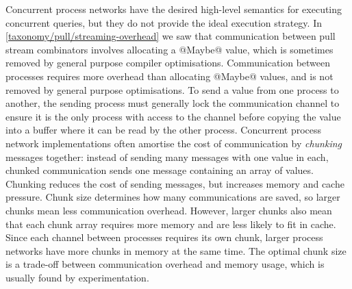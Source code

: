 Concurrent process networks have the desired high-level semantics for executing concurrent queries, but they do not provide the ideal execution strategy.
In \autoref{taxonomy/pull/streaming-overhead} we saw that communication between pull stream combinators involves allocating a @Maybe@ value, which is sometimes removed by general purpose compiler optimisations.
Communication between processes requires more overhead than allocating @Maybe@ values, and is not removed by general purpose optimisations.
To send a value from one process to another, the sending process must generally lock the communication channel to ensure it is the only process with access to the channel before copying the value into a buffer where it can be read by the other process.
Concurrent process network implementations often amortise the cost of communication by \emph{chunking} messages together: instead of sending many messages with one value in each, chunked communication sends one message containing an array of values.
Chunking reduces the cost of sending messages, but increases memory and cache pressure.
Chunk size determines how many communications are saved, so larger chunks mean less communication overhead.
However, larger chunks also mean that each chunk array requires more memory and are less likely to fit in cache.
Since each channel between processes requires its own chunk, larger process networks have more chunks in memory at the same time.
The optimal chunk size is a trade-off between communication overhead and memory usage, which is usually found by experimentation.



